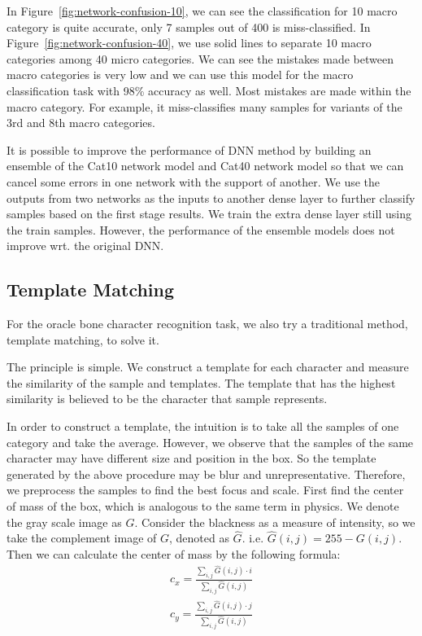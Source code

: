 \documentclass[journal]{IEEEtran}
\begin{document}
In Figure~\ref{fig:network-confusion-10}, we can see the classification for 10 macro category is quite accurate, only 7 samples out of 400 is miss-classified.
In Figure~\ref{fig:network-confusion-40}, we use solid lines to separate 10 macro categories among 40 micro categories.
We can see the mistakes made between macro categories is very low and we can use this model for the macro classification task with 98\% accuracy as well.
Most mistakes are made within the macro category.
For example, it miss-classifies many samples for variants of the 3rd and 8th macro categories.

It is possible to improve the performance of DNN method by building an ensemble of the Cat10 network model and Cat40 network model so that we can cancel some errors in one network with the support of another.
We use the outputs from two networks as the inputs to another dense layer to further classify samples based on the first stage results.
We train the extra dense layer still using the train samples.
However, the performance of the ensemble models does not improve wrt. the original DNN.

\subsection{Template Matching}
For the oracle bone character recognition task, we also try a traditional method, template matching, to solve it.

The principle is simple. We construct a template for each character and measure the similarity of the sample and templates. The template that has the highest similarity is believed to be the character that sample represents.

In order to construct a template, the intuition is to take all the samples of one category and take the average. However, we observe that the samples of the same character may have different size and position in the box. So the template generated by the above procedure may be blur and unrepresentative. Therefore, we preprocess the samples to find the best focus and scale. First find the center of mass of the box, which is analogous to the same term in physics. We denote the gray scale image as $G$. Consider the blackness as a measure of intensity, so we take the complement image of $G$, denoted as $\hat{G}$. i.e. $\hat{G}(i,j)=255-G(i,j)$. Then we can calculate the center of mass by the following formula:
\begin{align*}
	c_x=\frac{\sum_{i,j}\hat{G}(i,j)\cdot i}{\sum_{i,j} \hat{G}(i,j)} \\
	c_y=\frac{\sum_{i,j}\hat{G}(i,j)\cdot j}{\sum_{i,j} \hat{G}(i,j)}
\end{align*}
\end{document}

